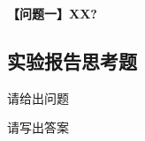 \documentclass[dvipsnames, svgnames,a4paper,11pt]{article}
\begin{document}
	\textbf{【问题一】XX?}

	


\subsection{实验报告思考题}
	\begin{question}
		请给出问题
	\end{question}
		请写出答案

		

\clearpage
{}




\end{document}
